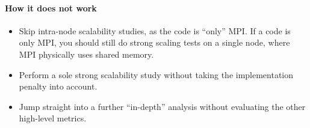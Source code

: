 \paragraph*{How it does not work}

\begin{itemize}[noitemsep]
  \item[$\boxminus$] Skip intra-node scalability studies, as the code is ``only'' MPI. If a code is only MPI, you should still do strong scaling tests on a single node, where MPI physically uses shared memory.
  \item[$\boxminus$] Perform a sole strong scalability study without taking the implementation penalty into account.
  \item[$\boxminus$] Jump straight into a further ``in-depth'' analysis without evaluating the other high-level metrics.
\end{itemize}
